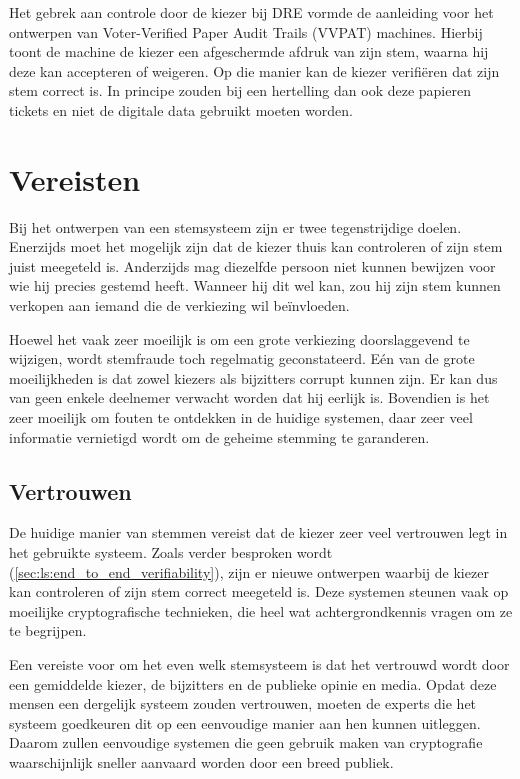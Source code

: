 \npar Het gebrek aan controle door de kiezer bij DRE vormde de aanleiding voor het ontwerpen van Voter-Verified Paper Audit Trails (VVPAT) machines. Hierbij toont de machine de kiezer een afgeschermde afdruk van zijn stem, waarna hij deze kan accepteren of weigeren. Op die manier kan de kiezer verifi\"eren dat zijn stem correct is. In principe zouden bij een hertelling dan ook deze papieren tickets en niet de digitale data gebruikt moeten worden.

\section{Vereisten}

Bij het ontwerpen van een stemsysteem zijn er twee tegenstrijdige doelen. Enerzijds moet het mogelijk zijn dat de kiezer thuis kan controleren of zijn stem juist meegeteld is. Anderzijds mag diezelfde persoon niet kunnen bewijzen voor wie hij precies gestemd heeft. Wanneer hij dit wel kan, zou hij zijn stem kunnen verkopen aan iemand die de verkiezing wil beïnvloeden.

\npar Hoewel het vaak zeer moeilijk is om een grote verkiezing doorslaggevend te wijzigen, wordt stemfraude toch regelmatig geconstateerd.\cite{adida_advances_in_cryptographic_voting_systems} E\'en van de grote moeilijkheden is dat zowel kiezers als bijzitters corrupt kunnen zijn. Er kan dus van geen enkele deelnemer verwacht worden dat hij eerlijk is. Bovendien is het zeer moeilijk om fouten te ontdekken in de huidige systemen, daar zeer veel informatie vernietigd wordt om de geheime stemming te garanderen.

\subsection{Vertrouwen}
\label{sec:ls:vertrouwen}

De huidige manier van stemmen vereist dat de kiezer zeer veel vertrouwen legt in het gebruikte systeem. Zoals verder besproken wordt (\ref{sec:ls:end_to_end_verifiability}), zijn er nieuwe ontwerpen waarbij de kiezer kan controleren of zijn stem correct meegeteld is. Deze systemen steunen vaak op moeilijke cryptografische technieken, die heel wat achtergrondkennis vragen om ze te begrijpen.

\npar Een vereiste voor om het even welk stemsysteem is dat het vertrouwd wordt door een gemiddelde kiezer, de bijzitters en de publieke opinie en media. Opdat deze mensen een dergelijk systeem zouden vertrouwen, moeten de experts die het systeem goedkeuren dit op een eenvoudige manier aan hen kunnen uitleggen.\cite{randell_ryan_voting_technologies_and_trust} Daarom zullen eenvoudige systemen die geen gebruik maken van cryptografie waarschijnlijk sneller aanvaard worden door een breed publiek.

